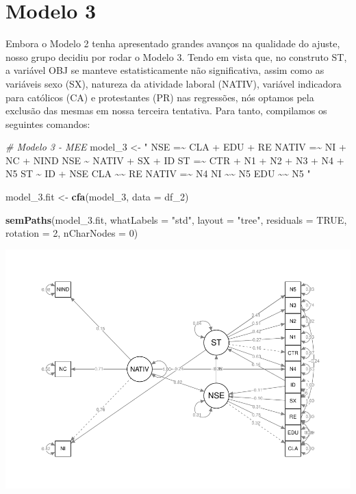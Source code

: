 \documentclass[
  12pt,
]{article}
\newenvironment{Shaded}{\begin{snugshade}}{\end{snugshade}}
\newcommand{\CommentTok}[1]{\textcolor[rgb]{0.56,0.35,0.01}{\textit{#1}}}
\newcommand{\DataTypeTok}[1]{\textcolor[rgb]{0.13,0.29,0.53}{#1}}
\newcommand{\DecValTok}[1]{\textcolor[rgb]{0.00,0.00,0.81}{#1}}
\newcommand{\FloatTok}[1]{\textcolor[rgb]{0.00,0.00,0.81}{#1}}
\newcommand{\KeywordTok}[1]{\textcolor[rgb]{0.13,0.29,0.53}{\textbf{#1}}}
\newcommand{\NormalTok}[1]{#1}
\newcommand{\OtherTok}[1]{\textcolor[rgb]{0.56,0.35,0.01}{#1}}
\newcommand{\StringTok}[1]{\textcolor[rgb]{0.31,0.60,0.02}{#1}}
\begin{document}
\hypertarget{modelo-3}{%
\section{Modelo 3}\label{modelo-3}}

Embora o Modelo 2 tenha apresentado grandes avanços na qualidade do
ajuste, nosso grupo decidiu por rodar o Modelo 3. Tendo em vista que, no
construto ST, a variável OBJ se manteve estatisticamente não
significativa, assim como as variáveis sexo (SX), natureza da atividade
laboral (NATIV), variável indicadora para católicos (CA) e protestantes
(PR) nas regressões, nós optamos pela exclusão das mesmas em nossa
terceira tentativa. Para tanto, compilamos os seguintes comandos:

\scriptsize
\singlespacing

\begin{Shaded}
\begin{Highlighting}[]
\CommentTok{\# Modelo 3 {-} MEE}
\NormalTok{model\_}\DecValTok{3}\NormalTok{ \textless{}{-}}\StringTok{ "}
\StringTok{NSE =\textasciitilde{} CLA + EDU + RE}
\StringTok{NATIV =\textasciitilde{} NI + NC + NIND}
\StringTok{NSE \textasciitilde{} NATIV + SX + ID}
\StringTok{ST =\textasciitilde{} CTR + N1 + N2 + N3 + N4 + N5}
\StringTok{ST \textasciitilde{} ID + NSE}
\StringTok{CLA \textasciitilde{}\textasciitilde{}  RE}
\StringTok{NATIV   =\textasciitilde{}  N4}
\StringTok{NI  \textasciitilde{}\textasciitilde{}  N5}
\StringTok{EDU \textasciitilde{}\textasciitilde{}  N5}
\StringTok{"}

\NormalTok{model\_}\FloatTok{3.}\NormalTok{fit \textless{}{-}}\StringTok{ }\KeywordTok{cfa}\NormalTok{(model\_}\DecValTok{3}\NormalTok{, }\DataTypeTok{data =}\NormalTok{ df\_}\DecValTok{2}\NormalTok{)}

\KeywordTok{semPaths}\NormalTok{(model\_}\FloatTok{3.}\NormalTok{fit,}
         \DataTypeTok{whatLabels =} \StringTok{"std"}\NormalTok{,}
         \DataTypeTok{layout =} \StringTok{"tree"}\NormalTok{,}
         \DataTypeTok{residuals =} \OtherTok{TRUE}\NormalTok{,}
         \DataTypeTok{rotation =} \DecValTok{2}\NormalTok{,}
         \DataTypeTok{nCharNodes =} \DecValTok{0}\NormalTok{)}
\end{Highlighting}
\end{Shaded}

\includegraphics{trabalho_final_files/figure-latex/unnamed-chunk-9-1.pdf}
\end{document}
